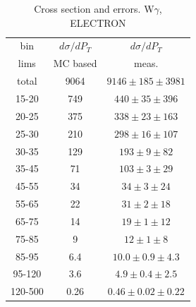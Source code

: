 \begin{table}[h]
  \scriptsize
  \begin{center}
  \caption{Cross section and errors. W$\gamma$, ELECTRON}
  \begin{tabular}{|c|c|c|}
    bin & $d\sigma/dP_{T}$ &$d\sigma/dP_{T}$ \\ 
    lims & MC based &    meas.       \\ \hline
    total & 9064 & $9146 \pm 185 \pm 3981$ \\ \hline
    15-20 & 749 & $440 \pm 35 \pm 396$ \\ \hline
    20-25 & 375 & $338 \pm 23 \pm 163$ \\ \hline
    25-30 & 210 & $298 \pm 16 \pm 107$ \\ \hline
    30-35 & 129 & $193 \pm 9 \pm 82$ \\ \hline
    35-45 & 71 & $103 \pm 3 \pm 29$ \\ \hline
    45-55 & 34 & $34 \pm 3 \pm 24$ \\ \hline
    55-65 & 22 & $31 \pm 2 \pm 18$ \\ \hline
    65-75 & 14 & $19 \pm 1 \pm 12$ \\ \hline
    75-85 & 9 & $12 \pm 1 \pm 8$ \\ \hline
    85-95 & 6.4 & $10.0 \pm 0.9 \pm 4.3$ \\ \hline
    95-120 & 3.6 & $4.9 \pm 0.4 \pm 2.5$ \\ \hline
    120-500 & 0.26 & $0.46 \pm 0.02 \pm 0.22$ \\ \hline
  \end{tabular}
  \label{tab:sc_mc_vs_meas_ELECTRON_WGamma}
  \end{center}
\end{table}


